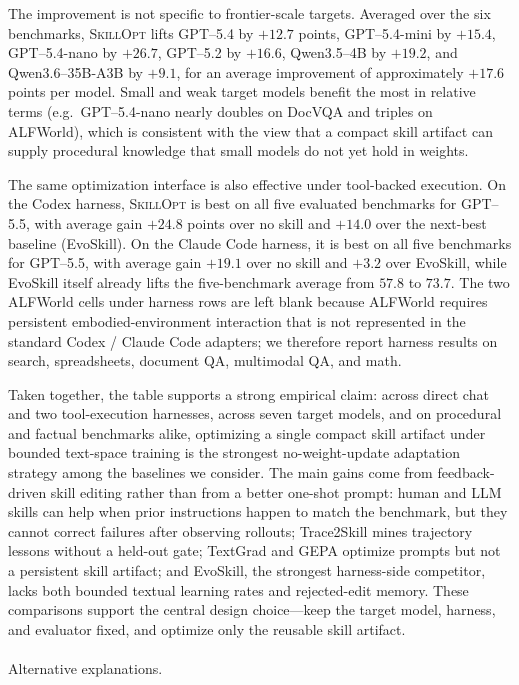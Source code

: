 \documentclass[
]{article}
\makeatletter
\let\oldparagraph\paragraph
\renewcommand{\paragraph}{
    \@ifstar
      \xxxParagraphStar
      \xxxParagraphNoStar
  }
\newcommand{\xxxParagraphStar}[1]{\oldparagraph*{#1}\mbox{}}
\newcommand{\xxxParagraphNoStar}[1]{\oldparagraph{#1}\mbox{}}
\newcommand{\ourmethod}{\textsc{SkillOpt}\xspace}
\makeatother
\begin{document}
The improvement is not specific to frontier-scale targets. Averaged over
the six benchmarks, \ourmethod{} lifts GPT--5.4 by \(+12.7\) points,
GPT--5.4-mini by \(+15.4\), GPT--5.4-nano by \(+26.7\), GPT--5.2 by
\(+16.6\), Qwen3.5--4B by \(+19.2\), and Qwen3.6--35B-A3B by \(+9.1\),
for an average improvement of approximately \(+17.6\) points per model.
Small and weak target models benefit the most in relative terms
(e.g.~GPT--5.4-nano nearly doubles on DocVQA and triples on ALFWorld),
which is consistent with the view that a compact skill artifact can
supply procedural knowledge that small models do not yet hold in
weights.

The same optimization interface is also effective under tool-backed
execution. On the Codex harness, \ourmethod{} is best on all five
evaluated benchmarks for GPT--5.5, with average gain \(+24.8\) points
over no skill and \(+14.0\) over the next-best baseline (EvoSkill). On
the Claude Code harness, it is best on all five benchmarks for GPT--5.5,
with average gain \(+19.1\) over no skill and \(+3.2\) over EvoSkill,
while EvoSkill itself already lifts the five-benchmark average from
\(57.8\) to \(73.7\). The two ALFWorld cells under harness rows are left
blank because ALFWorld requires persistent embodied-environment
interaction that is not represented in the standard Codex / Claude Code
adapters; we therefore report harness results on search, spreadsheets,
document QA, multimodal QA, and math.

Taken together, the table supports a strong empirical claim: across
direct chat and two tool-execution harnesses, across seven target
models, and on procedural and factual benchmarks alike, optimizing a
single compact skill artifact under bounded text-space training is the
strongest no-weight-update adaptation strategy among the baselines we
consider. The main gains come from feedback-driven skill editing rather
than from a better one-shot prompt: human and LLM skills can help when
prior instructions happen to match the benchmark, but they cannot
correct failures after observing rollouts; Trace2Skill mines trajectory
lessons without a held-out gate; TextGrad and GEPA optimize prompts but
not a persistent skill artifact; and EvoSkill, the strongest
harness-side competitor, lacks both bounded textual learning rates and
rejected-edit memory. These comparisons support the central design
choice---keep the target model, harness, and evaluator fixed, and
optimize only the reusable skill artifact.

\paragraph{Alternative explanations.}\label{alternative-explanations.}
\end{document}
